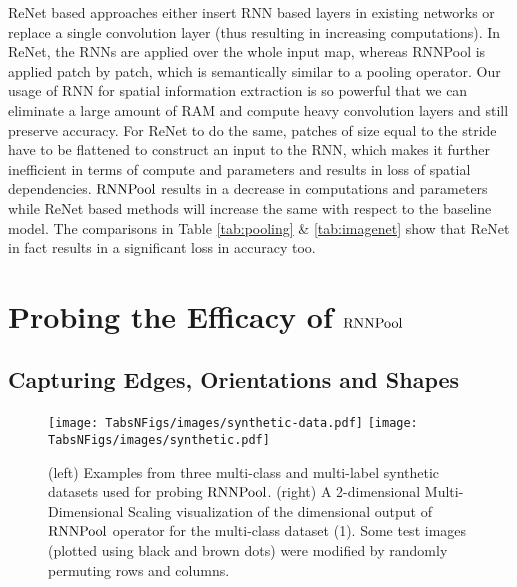 \documentclass[10pt]{article}
\newcommand{\rpool}{\ensuremath{{\rm RNNPool}}\xspace}
\begin{document}
ReNet based approaches either insert RNN based layers in existing
networks or replace a single convolution layer (thus resulting in
increasing computations). In ReNet, the RNNs are applied over the
whole input map, whereas RNNPool is applied patch by patch, which is
semantically similar to a pooling operator. Our usage of RNN for
spatial information extraction is so powerful that we can eliminate a
large amount of RAM and compute heavy convolution layers and still
preserve accuracy. For ReNet to do the same, patches of size equal to
the stride have to be flattened to construct an input to the RNN,
which makes it further inefficient in terms of compute and parameters
and results in loss of spatial dependencies. \rpool results in a
decrease in computations and parameters while ReNet based methods will
increase the same with respect to the baseline model. The comparisons
in Table \ref{tab:pooling} \& \ref{tab:imagenet} show that ReNet in
fact results in a significant loss in accuracy too.
 \section{Probing the Efficacy of \rpool}
\subsection{Capturing Edges, Orientations and Shapes}
\label{sec:edges}


\begin{figure}[t]
    \centering
    \texttt{[image: TabsNFigs/images/synthetic-data.pdf]}\qquad
    \texttt{[image: TabsNFigs/images/synthetic.pdf]}\caption{(left) Examples from three multi-class and multi-label
      synthetic datasets used for probing \rpool. (right) A
      2-dimensional Multi-Dimensional Scaling visualization of the
       dimensional output of \rpool operator for the multi-class
      dataset (1). Some test images (plotted using black and brown
      dots) were modified by randomly permuting rows and columns.}\label{fig:synthetic}\end{figure}
\end{document}
